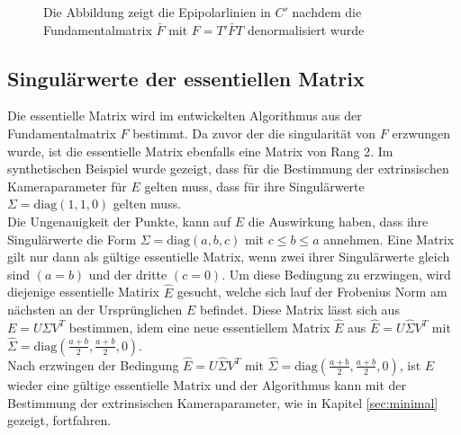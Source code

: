 \begin{figure}[!htb]
	\caption{Die Abbildung zeigt die Epipolarlinien in $C'$ nachdem die Fundamentalmatrix $\bar{F}$ mit $F = T'\bar{F}T$ denormalisiert wurde}
	\label{fig:EpipoleWithF2Denorm}
	\endminipage\hfill
\end{figure}

\pagebreak

\subsection{Singulärwerte der essentiellen Matrix}

Die essentielle Matrix wird im entwickelten Algorithmus aus der Fundamentalmatrix $F$ bestimmt. Da zuvor der die singularität von $F$ erzwungen wurde, ist die essentielle Matrix ebenfalls eine Matrix von Rang 2\cite{HZ}. Im synthetischen Beispiel wurde gezeigt, dass für die Bestimmung der extrinsischen Kameraparameter für $E$ gelten muss, dass für ihre Singulärwerte $\Sigma = \text{diag}(1,1,0)$ gelten muss. \\

Die Ungenauigkeit der Punkte, kann auf $E$ die Auswirkung haben, dass ihre Singulärwerte die Form $\Sigma = \text{diag}(a,b,c)$ mit $c \leq b \leq a$ annehmen. Eine Matrix gilt nur dann als gültige essentielle Matrix, wenn zwei ihrer Singulärwerte gleich sind $(a = b)$ und der dritte $(c=0)$. Um diese Bedingung zu erzwingen, wird diejenige essentielle Matirix $\hat{E}$ gesucht, welche sich lauf der Frobenius Norm am nächsten an der Ursprünglichen $E$ befindet\cite{HZ,Ferid}. Diese Matrix lässt sich aus $E = U \Sigma V^T$ bestimmen, idem eine neue essentiellem Matrix $\hat{E}$ aus $\hat{E} = U \hat{\Sigma}V^T$ mit $\hat{\Sigma} = \text{diag}(\frac{a+b}{2},\frac{a+b}{2},0)$\cite{HZ}.\\

Nach erzwingen der Bedingung $\hat{E} = U \hat{\Sigma}V^T$ mit $\hat{\Sigma} = \text{diag}(\frac{a+b}{2},\frac{a+b}{2},0)$, ist $E$ wieder eine gültige essentielle Matrix und der Algorithmus kann mit der Bestimmung der extrinsischen Kameraparameter, wie in Kapitel \ref{sec:minimal} gezeigt, fortfahren.


